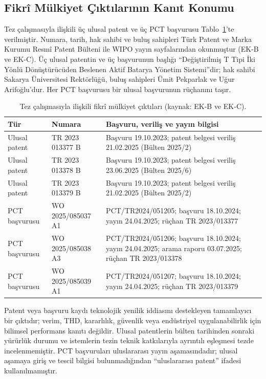 \subsection{Fikrî Mülkiyet Çıktılarının Kanıt Konumu}

Tez çalışmasıyla ilişkili üç ulusal patent ve üç PCT başvurusu Tablo~\ref{tab:fikri-mulkiyet}'te verilmiştir. Numara, tarih, hak sahibi ve buluş sahipleri Türk Patent ve Marka Kurumu Resmî Patent Bülteni ile WIPO yayın sayfalarından okunmuştur (EK-B ve EK-C). Üç ulusal patentin ve üç başvurunun başlığı ``Değiştirilmiş T Tipi İki Yönlü Dönüştürücüden Beslenen Aktif Batarya Yönetim Sistemi''dir; hak sahibi Sakarya Üniversitesi Rektörlüğü, buluş sahipleri Ümit Pekparlak ve Uğur Arifoğlu'dur. Her PCT başvurusu bir ulusal başvurunun rüçhanını taşır.

\begin{table}[htbp]
  \centering
  \caption{Tez çalışmasıyla ilişkili fikrî mülkiyet çıktıları (kaynak: EK-B ve EK-C).}
  \label{tab:fikri-mulkiyet}
  \small
  \begin{tabularx}{\textwidth}{p{}p{}X}
    \toprule
    \textbf{Tür} & \textbf{Numara} & \textbf{Başvuru, veriliş ve yayın bilgisi} \\
    \midrule
    Ulusal patent & TR 2023 013377 B & Başvuru 19.10.2023; patent belgesi veriliş 21.02.2025 (Bülten 2025/2) \\
    Ulusal patent & TR 2023 013378 B & Başvuru 19.10.2023; patent belgesi veriliş 23.06.2025 (Bülten 2025/6) \\
    Ulusal patent & TR 2023 013379 B & Başvuru 19.10.2023; patent belgesi veriliş 21.02.2025 (Bülten 2025/2) \\
    PCT başvurusu & WO 2025/085037 A1 & PCT/TR2024/051205; başvuru 18.10.2024; yayın 24.04.2025; rüçhan TR 2023/013377 \\
    PCT başvurusu & WO 2025/085038 A3 & PCT/TR2024/051206; başvuru 18.10.2024; yayın 24.04.2025; arama raporu 03.07.2025; rüçhan TR 2023/013378 \\
    PCT başvurusu & WO 2025/085039 A1 & PCT/TR2024/051207; başvuru 18.10.2024; yayın 24.04.2025; rüçhan TR 2023/013379 \\
    \bottomrule
  \end{tabularx}
\end{table}

Patent veya başvuru kaydı teknolojik yenilik iddiasını destekleyen tamamlayıcı bir çıktıdır; verim, THD, kararlılık, güvenlik veya endüstriyel uygulanabilirlik için bilimsel performans kanıtı değildir. Ulusal patentlerin bülten tarihinden sonraki yürürlük durumu ve istemlerin tezin teknik katkılarıyla ayrıntılı eşleşmesi tezde incelenmemiştir. PCT başvuruları uluslararası yayın aşamasındadır; ulusal aşamaya giriş ve tescil bilgisi bulunmadığından ``uluslararası patent'' ifadesi kullanılmamıştır.

